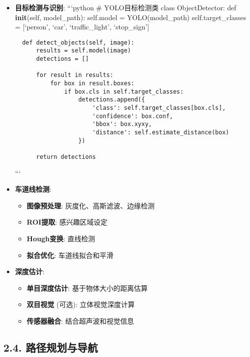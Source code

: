 \begin{itemize}
\item
  \textbf{目标检测与识别}: ```python \# YOLO目标检测类 class
  ObjectDetector: def \textbf{init}(self, model\_path): self.model =
  YOLO(model\_path) self.target\_classes = {[}`person', `car',
  `traffic\_light', `stop\_sign'{]}

\begin{lstlisting}
  def detect_objects(self, image):
      results = self.model(image)
      detections = []

      for result in results:
          for box in result.boxes:
              if box.cls in self.target_classes:
                  detections.append({
                      'class': self.target_classes[box.cls],
                      'confidence': box.conf,
                      'bbox': box.xyxy,
                      'distance': self.estimate_distance(box)
                  })

      return detections
\end{lstlisting}

  ```
\item
  \textbf{车道线检测}:

  \begin{itemize}
  \tightlist
  \item
    \textbf{图像预处理}: 灰度化、高斯滤波、边缘检测
  \item
    \textbf{ROI提取}: 感兴趣区域设定
  \item
    \textbf{Hough变换}: 直线检测
  \item
    \textbf{拟合优化}: 车道线拟合和平滑
  \end{itemize}
\item
  \textbf{深度估计}:

  \begin{itemize}
  \tightlist
  \item
    \textbf{单目深度估计}: 基于物体大小的距离估算
  \item
    \textbf{双目视觉} (可选): 立体视觉深度计算
  \item
    \textbf{传感器融合}: 结合超声波和视觉信息
  \end{itemize}
\end{itemize}

\subsection{2.4.
路径规划与导航}\label{ux8defux5f84ux89c4ux5212ux4e0eux5bfcux822a}

